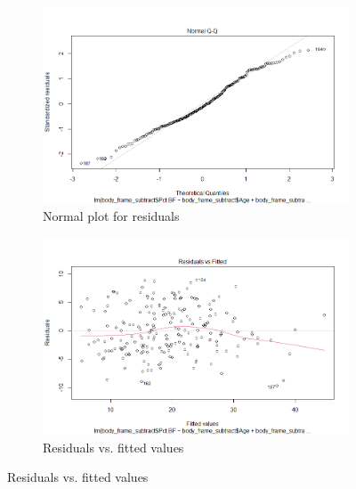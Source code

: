 \documentclass[12pt]{article}
\begin{document}
\begin{figure}
\begin{subfigure}{.45\textwidth}
  \centering
  \includegraphics[width=.8\linewidth]{normqq3.png}  
  \caption{Normal plot for residuals}
  \label{fig:sub-first}
\end{subfigure}
\begin{subfigure}{.45\textwidth}
  \centering
  \includegraphics[width=.8\linewidth]{residvfit3.png}  
  \caption{Residuals vs. fitted values}
  \label{fig:sub-second}
\end{subfigure}

\newline


\end{figure}
\end{document}
